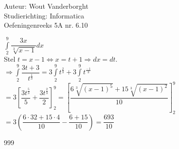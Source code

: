 \documentclass[a4paper]{article}
\newcommand{\Dint}{\displaystyle\int\limits}
\begin{document}
  
\noindent \large Auteur: Wout Vanderborght\\
\noindent \large Studierichting: Informatica\\
\noindent \large Oefeningenreeks 5A nr. 6.10\\

\medskip

\normalsize

$\Dint^9_2 \dfrac{3x}{\sqrt[3]{x-1}}dx $ \\

Stel $ t = x - 1 \Leftrightarrow x = t + 1 \Rightarrow dx = dt $. \\

$ \Rightarrow \Dint^9_2 \dfrac{3t+3}{t^{\tfrac{1}{3}}} = 3\Dint^9_2 t^{\tfrac{2}{3}} + 3\Dint^9_2 t^{\tfrac{-1}{3}} $ \\

$ = 3\left[ \dfrac{3t^{\tfrac{5}{3}}}{5} + \dfrac{3t^{\tfrac{2}{3}}}{2} \right]^9_2 = \left[ \dfrac{6\sqrt[3]{(x-1)^5} + 15\sqrt[3]{(x-1)^2}}{10} \right]^9_2 $ \\

$ = 3\left( \dfrac{6\cdot32 + 15\cdot4}{10} - \dfrac{6 + 15}{10} \right) = \dfrac{693}{10} $


\begin{thebibliography}{999}
\end{thebibliography}
\end{document}
